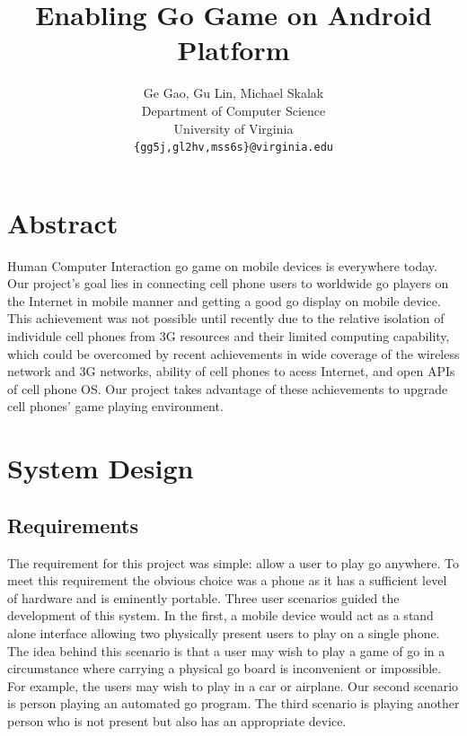 \documentclass[acmtocl]{acmtrans2m}
\begin{document}
\title{Enabling Go Game on Android Platform} %
\author{
  Ge Gao, Gu Lin, Michael Skalak\\
Department of Computer Science\\
University of Virginia\\
\texttt{\{gg5j,gl2hv,mss6s\}@virginia.edu}\\
}  %
\date{}  %


\maketitle

\section{Abstract}
Human Computer Interaction go game on mobile devices is everywhere today. Our project's goal lies in connecting cell phone users to worldwide go players on the Internet in mobile manner and getting a good go display on mobile device. This achievement was not possible until recently due to the relative isolation of individule cell phones from 3G resources and their limited computing capability, which could be overcomed by recent  achievements in wide coverage of the wireless network and 3G networks, ability of cell phones to acess Internet, and open APIs of cell phone OS. Our project takes advantage of these achievements to upgrade cell phones' game playing environment.

\section{System Design}

\subsection{Requirements}

The requirement for this project was simple: allow a user to play go anywhere.  To meet this requirement the obvious choice was a phone as it has a sufficient level of hardware and is eminently portable.  Three user scenarios guided the development of this system.  In the first, a mobile device would act as a stand alone interface allowing two physically present users to play on a single phone.  The idea behind this scenario is that a user may wish to play a game of go in a circumstance where carrying a physical go board is inconvenient or impossible.  For example, the users may wish to play in a car or airplane.  Our second scenario is person playing an automated go program.  The third scenario is playing another person who is not present but also has an appropriate device.  
\end{document}
